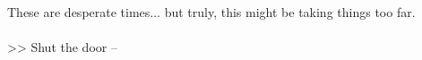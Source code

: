 These are desperate times... but truly, this might be taking things too far.\\
\\

>> Shut the door -- 